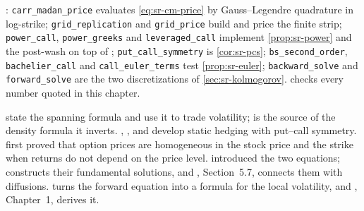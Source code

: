 \begin{incode}
: \texttt{carr\_madan\_price} evaluates \eqref{eq:sr-cm-price} by
Gauss--Legendre quadrature in log-strike; \texttt{grid\_replication} and \texttt{grid\_price} build and price the
finite strip; \texttt{power\_call}, \texttt{power\_greeks} and \texttt{leveraged\_call} implement
\cref{prop:sr-power} and the post-wash on top of ; \texttt{put\_call\_symmetry} is
\cref{cor:sr-pcs}; \texttt{bs\_second\_order}, \texttt{bachelier\_call} and \texttt{call\_euler\_terms} test
\cref{prop:sr-euler}; \texttt{backward\_solve} and \texttt{forward\_solve} are the two discretizations of
\cref{sec:sr-kolmogorov}.  checks every number quoted in this chapter.
\end{incode}


\furtherreading
\textcite{carr-madan} state the spanning formula and use it to trade volatility; \textcite{breeden-litzenberger}
is the source of the density formula it inverts. \textcite{bowie-carr}, \textcite{carr-chou},
\textcite{carr-ellis-gupta} and \textcite{carr-lee-pcs} develop static hedging with put--call symmetry.
\textcite{merton1973} first proved that option prices are homogeneous in the stock price and the strike when
returns do not depend on the price level. \textcite{kolmogorov-1931} introduced the two equations;
\textcite{friedman-parabolic} constructs their fundamental solutions, and \textcite{karatzas-shreve},
Section~5.7, connects them with diffusions. \textcite{dupire} turns the forward equation into a formula for the
local volatility, and \textcite{gatheral-volatility-surface}, Chapter~1, derives it.
